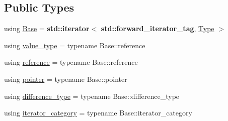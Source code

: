 \subsection*{Public Types}
\begin{DoxyCompactItemize}
\item 
using \hyperlink{classhandy_1_1Range_1_1Iterator_ae982d471802ac0e3746e326c3aa2fc14}{Base} = {\bf std\+::iterator}$<$ {\bf std\+::forward\+\_\+iterator\+\_\+tag}, \hyperlink{classhandy_1_1Range_a2a8c2d169657c93464989e7608ed3f9b}{Type} $>$
\item 
using \hyperlink{classhandy_1_1Range_1_1Iterator_a99f227df409cebfc6fa8250b5868e8a3}{value\+\_\+type} = typename Base\+::reference
\item 
using \hyperlink{classhandy_1_1Range_1_1Iterator_ab182b2493e468efbced9983e3e38dbe4}{reference} = typename Base\+::reference
\item 
using \hyperlink{classhandy_1_1Range_1_1Iterator_a2a4a02c25dce296702ceb66fe75f9918}{pointer} = typename Base\+::pointer
\item 
using \hyperlink{classhandy_1_1Range_1_1Iterator_ac7bf1cb755fa3ca0f213b19f0fdbe8de}{difference\+\_\+type} = typename Base\+::difference\+\_\+type
\item 
using \hyperlink{classhandy_1_1Range_1_1Iterator_a5e9da733ea7dadc2cc69327288e3e7a2}{iterator\+\_\+category} = typename Base\+::iterator\+\_\+category
\end{DoxyCompactItemize}

